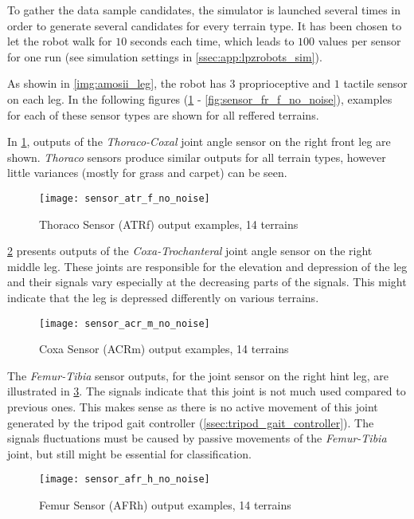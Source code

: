 To gather the data sample candidates, the simulator is launched several times in order to generate several candidates for every terrain type. It has been chosen to let the robot walk for $ 10 $ seconds each time, which leads to $ 100 $ values per sensor for one run (see simulation settings in \cref{ssec:app:lpzrobots_sim}).

As showin in \cref{img:amosii_leg}, the robot has $ 3 $ proprioceptive and $ 1 $ tactile sensor on each leg. In the following figures (\cref{fig:sensor_atr_f_no_noise} - \cref{fig:sensor_fr_f_no_noise}), examples for each of these sensor types are shown for all reffered terrains.

In \cref{fig:sensor_atr_f_no_noise}, outputs of the \textit{Thoraco-Coxal} joint angle sensor on the right front leg are shown. \textit{Thoraco} sensors produce similar outputs for all terrain types, however little variances (mostly for grass and carpet) can be seen.

\begin{figure}[H]
  \centering
  \texttt{[image: sensor\_atr\_f\_no\_noise]}
  \caption{Thoraco Sensor (ATRf) output examples, 14 terrains}
  \label{fig:sensor_atr_f_no_noise}
\end{figure}

\cref{fig:sensor_acr_m_no_noise} presents outputs of the \textit{Coxa-Trochanteral} joint angle sensor on the right middle leg. These joints are responsible for the elevation and depression of the leg and their signals vary especially at the decreasing parts of the signals. This might indicate that the leg is depressed differently on various terrains.

\begin{figure}[H]
  \centering
  \texttt{[image: sensor\_acr\_m\_no\_noise]}
  \caption{Coxa Sensor (ACRm) output examples, 14 terrains}
  \label{fig:sensor_acr_m_no_noise}
\end{figure}

The \textit{Femur-Tibia} sensor outputs, for the joint sensor on the right hint leg, are illustrated in \ref{fig:sensor_afr_h_no_noise}. The signals indicate that this joint is not much used compared to previous ones. This makes sense as there is no active movement of this joint generated by the tripod gait controller (\cref{ssec:tripod_gait_controller}). The signals fluctuations must be caused by passive movements of the \textit{Femur-Tibia} joint, but still might be essential for classification.

\begin{figure}[H]
  \centering
  \texttt{[image: sensor\_afr\_h\_no\_noise]}
  \caption{Femur Sensor (AFRh) output examples, 14 terrains}
  \label{fig:sensor_afr_h_no_noise}
\end{figure}

